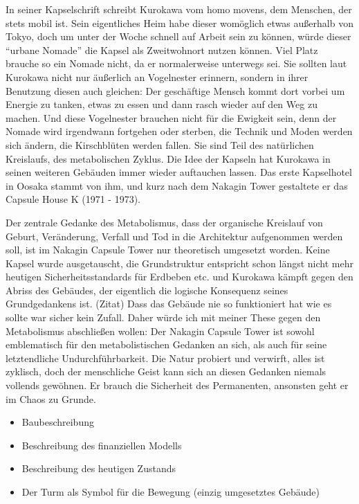\documentclass[a4paper, 12pt]{article}
\begin{document}
\begin{onehalfspace}
In seiner Kapselschrift schreibt Kurokawa vom homo movens, dem Menschen, der stets mobil ist. Sein eigentliches Heim habe dieser womöglich etwas außerhalb von Tokyo, doch um unter der Woche schnell auf Arbeit sein zu können, würde dieser “urbane Nomade” die Kapsel als Zweitwohnort nutzen können. Viel Platz brauche so ein Nomade nicht, da er normalerweise unterwegs sei. Sie sollten laut Kurokawa nicht nur äußerlich an Vogelnester erinnern, sondern in ihrer Benutzung diesen auch gleichen: Der geschäftige Mensch kommt dort vorbei um Energie zu tanken, etwas zu essen und dann rasch wieder auf den Weg zu machen. Und diese Vogelnester brauchen nicht für die Ewigkeit sein, denn der Nomade wird irgendwann fortgehen oder sterben, die Technik und Moden werden sich ändern, die Kirschblüten werden fallen. Sie sind Teil des natürlichen Kreislaufs, des metabolischen Zyklus. Die Idee der Kapseln hat Kurokawa in seinen weiteren Gebäuden immer wieder auftauchen lassen. Das erste Kapselhotel in Oosaka stammt von ihm, und kurz nach dem Nakagin Tower gestaltete er das Capsule House K (1971 - 1973). 


Der zentrale Gedanke des Metabolismus, dass der organische Kreislauf von Geburt, Veränderung, Verfall und Tod in die Architektur aufgenommen werden soll, ist im Nakagin Capsule Tower nur theoretisch umgesetzt worden. Keine Kapsel wurde ausgetauscht, die Grundstruktur entspricht schon längst nicht mehr heutigen Sicherheitsstandards für Erdbeben etc. und Kurokawa kämpft gegen den Abriss des Gebäudes, der eigentlich die logische Konsequenz seines Grundgedankens ist. (Zitat) Dass das Gebäude nie so funktioniert hat wie es sollte war sicher kein Zufall.
Daher würde ich mit meiner These gegen den Metabolismus abschließen wollen: Der Nakagin Capsule Tower ist sowohl emblematisch für den metabolistischen Gedanken an sich, als auch für seine letztendliche Undurchführbarkeit. Die Natur probiert und verwirft, alles ist zyklisch, doch der menschliche Geist kann sich an diesen Gedanken niemals vollends gewöhnen. Er brauch die Sicherheit des Permanenten, ansonsten geht er im Chaos zu Grunde. 



\begin{itemize}
  \item Baubeschreibung
  \item Beschreibung des finanziellen Modells
  \item Beschreibung des heutigen Zustands 
  \item Der Turm als Symbol für die Bewegung (einzig umgesetztes Gebäude)
\end{itemize}



\end{onehalfspace}
\end{document}
